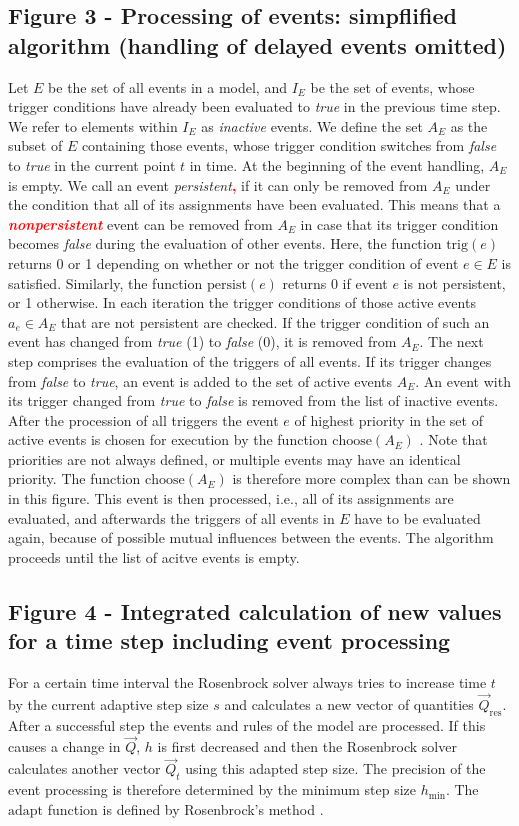 \documentclass[10pt]{bmc_article}
\newenvironment{bmcformat}{\baselineskip20pt\sloppy\setboolean{publ}{false}}{\baselineskip20pt\sloppy}
\newcommand{\TODO}[1]{\textcolor{red}{\textbf{#1}}}
\newcommand{\true}{\emph{true}}
\newcommand{\false}{\emph{false}}
\begin{document}
\begin{bmcformat}
\subsection*{Figure 3 - Processing of events: simpflified algorithm (handling of delayed events omitted)}
Let $E$ be the set of all events in a model, and $I_E$ be the set of events, whose trigger
conditions have already been evaluated to \true{} in the previous time step. We refer to elements within
$I_E$ as \emph{inactive} events. We define the set $A_E$ as the subset of $E$ containing those events,
whose trigger condition switches from \false{} to \true{} in the current point $t$ in time. At the beginning
of the event handling, $A_E$ is empty. We call an event \emph{persistent}\TODO{,} if it can only be removed from
$A_E$ under the condition that all of its assignments have been evaluated. This means that a
\TODO{\emph{nonpersistent}} event can be removed from $A_E$ in case that its trigger condition becomes \false{}
during the evaluation of other events. Here, the function $\mathrm{trig}(e)$ returns 0 or 1 depending 
on whether or not the trigger condition of event $e \in E$ is satisfied. Similarly, the function
$\mathrm{persist}(e)$ returns 0 if event $e$ is not persistent, or 1 otherwise.
In each iteration the trigger conditions of those active events $a_e \in A_E$ that are not persistent are checked.
If the trigger condition of such an event has changed from \true{} (1) to \false{} (0), it is removed from $A_E$.
The next step comprises the evaluation of the triggers of all events.
If its trigger changes from \false{} to \true{}, an event is added to the set of active events $A_E$.
An event with its trigger changed from \true{} to \false{} is removed from the list of inactive events.
After the procession of all triggers the event $e$ of highest priority in the set of active events is chosen for execution by the function $\mathrm{choose}(A_E)$ .
Note that priorities are not always defined, or multiple events may have an identical priority. The function $\mathrm{choose}(A_E)$ is therefore more complex than can be shown in this figure.
This event is then processed, i.e., all of its assignments are evaluated, and afterwards the triggers of all events in $E$ have to be evaluated again, because of possible mutual influences between the events.
The algorithm proceeds until the list of acitve events is empty.

\subsection*{Figure 4 - Integrated calculation of new values for a time step including event processing}
For a certain time interval the Rosenbrock solver always tries to increase time $t$ by the current adaptive
step size $s$ and calculates a new vector of quantities $\vec{Q}_{\mathrm{res}}$.
After a successful step the events and rules of the model are processed.
If this causes a change in $\vec{Q}$, $h$ is first decreased and then the Rosenbrock solver calculates another vector $\vec{Q}_{t}$ using this adapted step size.
The precision of the event processing is therefore determined by the minimum step size $h_{\min}$.
The $\mathrm{adapt}$ function is defined by Rosenbrock's method \cite{Press1993}.


\end{bmcformat}
\end{document}
